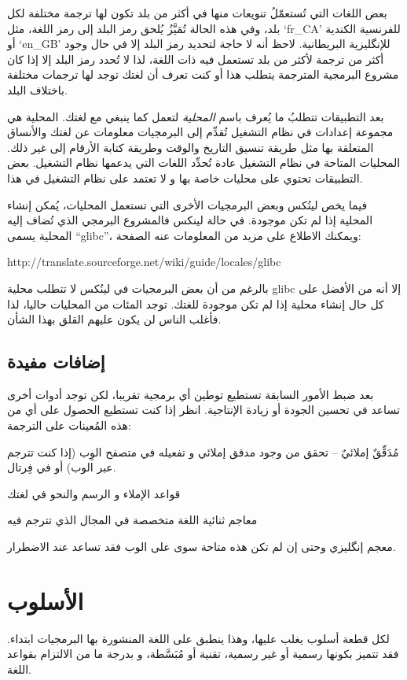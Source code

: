 بعض اللغات التي تُستعمّلُ تنويعات منها في أكثر من بلد تكون لها ترجمة
مختلفة لكل بلد، وفي هذه الحالة تُمَيَّزُ يُلحق رمز البلد إلى رمز اللغة،
مثل ‘fr\_CA’ للفرنسية الكندية أو ‘en\_GB’ للإنگليزية البريطانية. لاحظ
أنه لا حاجة لتحديد رمز البلد إلا في حال وجود أكثر من ترجمة لأكثر من بلد
تستعمل فيه ذات اللغة، لذا لا تُحدد رمز البلد إلا إذا كان مشروع البرمجية
المترجمة يتطلب هذا أو كنت تعرف أن لغتك توجد لها ترجمات مختلفة باختلاف
البلد.

بعد التطبيقات تتطلبُ ما يُعرف باسم {\it المحلية} لتعمل كما ينبغي مع
لغتك. المحلية هي مجموعة إعدادات في نظام التشغيل تُقدِّم إلى البرمجيات
معلومات عن لغتك والأنساق المتعلقة بها مثل طريقة تنسيق التاريخ والوقت
وطريقة كتابة الأرقام إلى غير ذلك. المحليات المتاحة في نظام التشغيل عادة
تُحدِّد اللغات التي يدعمها نظام التشغيل. بعض التطبيقات تحتوي على محليات
خاصة بها و لا تعتمد على نظام التشغيل في هذا.

فيما يخص لينُكس وبعض البرمجيات الأخرى التي تستعمل المحليات، يُمكن إنشاء
المحلية إذا لم تكن موجودة. في حالة لينكس فالمشروع البرمجي الذي تُضاف
إليه المحلية يسمى “glibc”، ويمكنك الاطلاع على مزيد من المعلومات عنه
الصفحة:

http://translate.sourceforge.net/wiki/guide/locales/glibc

بالرغم من أن بعض البرمجيات في لينُكس لا تتطلب محلية glibc إلا أنه من
الأفضل على كل حال إنشاء محلية إذا لم تكن موجودة للغتك. توجد المئات من
المحليات حاليا، لذا فأغلب الناس لن يكون عليهم القلق بهذا الشأن.

\section{إضافات مفيدة}
بعد ضبط الأمور السابقة تستطيع توطين أي برمجية تقريبا، لكن توجد أدوات
أخرى تساعد في تحسين الجودة أو زيادة الإنتاجية. انظر إذا كنت تستطيع
الحصول على أي من هذه المُعينات على الترجمة:

\startitemize[1]
\item مُدَقِّقٌ إملائيٌ -- تحقق من وجود مدقق إملائي و تفعيله في متصفح
الوِب (إذا كنت تترجم عبر الوب) أو في فِرتال.
\item قواعد الإملاء و الرسم والنحو في لغتك
\item معاجم ثنائية اللغة متخصصة في المجال الذي تترجم فيه
\item معجم إنگليزي
\stopitemize
وحتى إن لم تكن هذه متاحة سوى على الوب فقد تساعد عند الاضطرار.

\chapter{الأسلوب}
لكل قطعة أسلوب يغلب عليها، وهذا ينطبق على اللغة المنشورة بها البرمجيات
ابتداء. فقد تتميز بكونها رسمية أو غير رسمية، تقنية أو مُبَسَّطة، و
بدرجة ما من الالتزام بقواعد اللغة.

